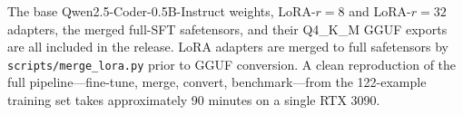 \documentclass[11pt,a4paper]{article}
\begin{document}
The base Qwen2.5-Coder-0.5B-Instruct weights, LoRA-$r{=}8$ and LoRA-$r{=}32$ adapters, the merged full-SFT safetensors, and their Q4\_K\_M GGUF exports are all included in the release. LoRA adapters are merged to full safetensors by \texttt{scripts/merge\_lora.py} prior to GGUF conversion. A clean reproduction of the full pipeline---fine-tune, merge, convert, benchmark---from the 122-example training set takes approximately 90 minutes on a single RTX 3090.



\end{document}

